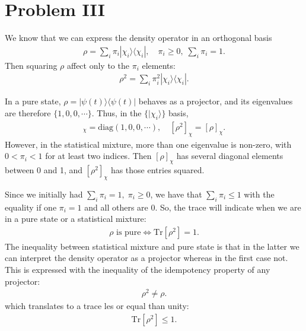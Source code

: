 \documentclass[letterpaper,11pt,twoside]{article}
\newcommand{\ket}[1]{|#1\rangle}
\newcommand{\bra}[1]{\langle#1|}
\begin{document}
\section*{Problem III}
We know that we can express the density operator in an orthogonal basis
\begin{align*}
  \rho=\sum_i\pi_i\ket{\chi_i}\bra{\chi_i},\quad \pi_i\geq0,\;\sum_i\pi_i=1.
\end{align*}
Then squaring $\rho$ affect only to the $\pi_i$ elements:
\begin{align*}
  \rho^2=\sum_i\pi_i^2\ket{\chi_i}\bra{\chi_i}.
\end{align*}

In a pure state, $\rho=\ket{\psi(t)}\bra{\psi(t)}$ behaves as a projector, and its eigenvalues are therefore $\{1,0,0,\cdots\}$.
Thus, in the $\{\ket{\chi_i}\}$ basis, 
\begin{align*}
  [\rho]_\chi=\text{diag}(1,0,0,\cdots),\quad[\rho^2]_\chi=[\rho]_\chi.
\end{align*}
However, in the statistical mixture, more than one eigenvalue is non-zero, with $0<\pi_i<1$ for at least two indices. Then $[\rho]_\chi$ has 
several diagonal elements between 0 and 1, and $[\rho^2]_\chi$ has those entries squared.

Since we initially had $\sum_i\pi_i=1,\;\pi_i\geq0$, we have that $\sum_i\pi_i\leq1$ with the equality if one $\pi_i=1$ and all others are 0.
So, the trace will indicate when we are in a pure state or a statistical mixture:
\begin{align*}
  \text{$\rho$ is pure}\Longleftrightarrow\text{Tr}[{\rho^2}]=1.
\end{align*} 
The inequality between statistical mixture and pure state is that in the latter we can interpret the density operator as a projector whereas in the first case not.
This is expressed with the inequality of the idempotency property of any projector:
\begin{align*}
  \rho^2\neq\rho.
\end{align*}
which translates to a trace les or equal than unity:
\begin{align*}
  \text{Tr}[\rho^2]\leq1.
\end{align*}

\end{document}
